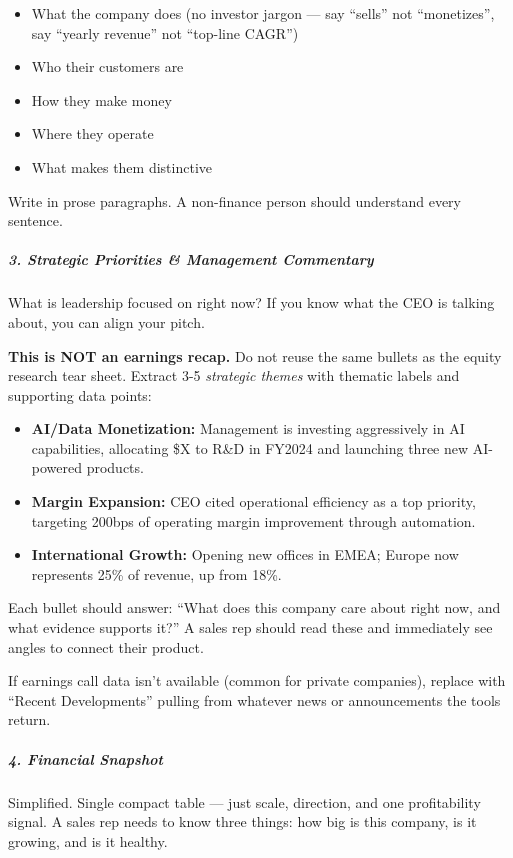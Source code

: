\documentclass[11pt]{article}
\begin{document}
\begin{itemize}[leftmargin=*,itemsep=2pt,topsep=2pt]
\item {} What the company does (no investor jargon — say ``sells'' not ``monetizes'', say ``yearly revenue'' not ``top-line CAGR'')
\item {} Who their customers are
\item {} How they make money
\item {} Where they operate
\item {} What makes them distinctive
\end{itemize}

Write in prose paragraphs. A non-finance person should understand every sentence.


\subparagraph{3. Strategic Priorities \& Management Commentary}\mbox{}\par
What is leadership focused on right now? If you know what the CEO is talking about, you can align your pitch.


\textbf{This is NOT an earnings recap.} Do not reuse the same bullets as the equity research tear sheet. Extract 3-5 \emph{strategic themes} with thematic labels and supporting data points:


\begin{itemize}[leftmargin=*,itemsep=2pt,topsep=2pt]
\item {} \textbf{AI/Data Monetization:} Management is investing aggressively in AI capabilities, allocating \$X to R\&D in FY2024 and launching three new AI-powered products.
\item {} \textbf{Margin Expansion:} CEO cited operational efficiency as a top priority, targeting 200bps of operating margin improvement through automation.
\item {} \textbf{International Growth:} Opening new offices in EMEA; Europe now represents 25\% of revenue, up from 18\%.
\end{itemize}

Each bullet should answer: ``What does this company care about right now, and what evidence supports it?'' A sales rep should read these and immediately see angles to connect their product.


If earnings call data isn't available (common for private companies), replace with ``Recent Developments'' pulling from whatever news or announcements the tools return.


\subparagraph{4. Financial Snapshot}\mbox{}\par
Simplified. Single compact table — just scale, direction, and one profitability signal. A sales rep needs to know three things: how big is this company, is it growing, and is it healthy.
\end{document}
